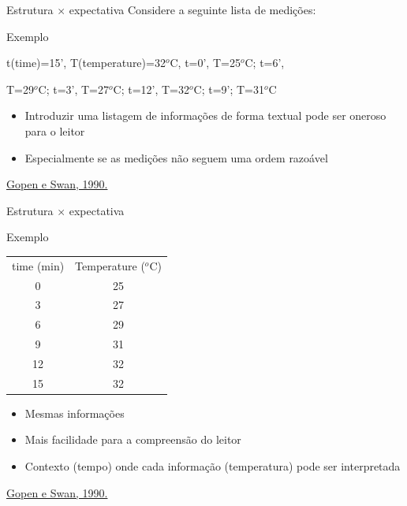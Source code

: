 \documentclass{beamer}
\begin{document}
\begin{frame}{Estrutura $\times$ expectativa}
  Considere a seguinte lista de medições:
  \begin{exampleblock}{Exemplo}
    \scriptsize
    \begin{center}
    t(time)=15', T(temperature)=32$^o$C, t=0', T=25$^o$C; t=6',

    T=29$^o$C; t=3', T=27$^o$C; t=12', T=32$^o$C; t=9'; T=31$^o$C
  \end{center}
  \end{exampleblock}

  \begin{itemize}
    \footnotesize
  \item Introduzir uma \alert{listagem} de informações de forma textual pode
    ser oneroso para o leitor
  \item Especialmente se as medições não seguem uma ordem razoável
  \end{itemize}
  \vfill
  \scriptsize
  \hfill \href{https://www.georgegopen.com/uploads/1/0/9/0/109073507/gopen___swan_sci_of_sci_writing_am_sci_1990_.pdf}{Gopen e Swan, 1990.}
\end{frame}

\begin{frame}{Estrutura $\times$ expectativa}
  \begin{exampleblock}{Exemplo}
    \footnotesize
    \begin{center}
    \begin{tabular}{cc}
      time (min) & Temperature ($^o$C) \\
      0 & 25 \\
      3 & 27 \\
      6 & 29 \\
      9 & 31 \\
      12 & 32 \\
      15 & 32 \\
    \end{tabular}
  \end{center}
  \end{exampleblock}
  \begin{itemize}
    \footnotesize
  \item<1-> Mesmas informações
  \item Mais facilidade para a compreensão do leitor
  \item \alert{Contexto} (tempo) onde cada \alert{informação}
    (temperatura) pode ser interpretada
  \end{itemize}
  \vfill
  \scriptsize
  \hfill \href{https://www.georgegopen.com/uploads/1/0/9/0/109073507/gopen___swan_sci_of_sci_writing_am_sci_1990_.pdf}{Gopen e Swan, 1990.}
\end{frame}
\end{document}
